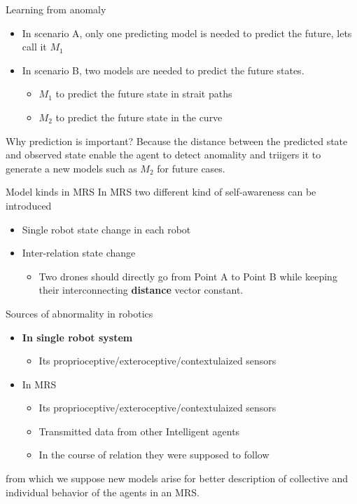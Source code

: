 \documentclass[unknownkeysallowed]{beamer}
\begin{document}
	\begin{frame}{Learning from anomaly}
		\begin{itemize}
			\item In scenario A, only one predicting model is needed to predict the future, lets call it $M_1$
			\item In scenario B, two models are needed to predict the future states.
			\begin{itemize}
				\item $M_1$ to predict the future state in strait paths
				\item $M_2$ to predict the future state in the curve
			\end{itemize}
		\end{itemize}
	\end{frame}

	\begin{frame}{Why prediction is important?}
		Because the distance between the predicted state and observed state enable the agent to detect anomality and triigers it to generate a new models such as $M_2$ for future cases.
	\end{frame}
	
	\begin{frame}{Model kinds in MRS}
		In MRS two different kind of self-awareness can be introduced
		\begin{itemize}
			\item Single robot state change in each robot
			\item Inter-relation state change
				\begin{itemize}
					\item Two drones should directly go from Point A to Point B while keeping their interconnecting \textbf{distance} vector constant.
				\end{itemize}
		\end{itemize}
	\end{frame}

	\begin{frame}{Sources of abnormality in robotics}
		\begin{itemize}
			\item \textbf{In single robot system}
				\begin{itemize}
					\item Its proprioceptive/exteroceptive/contextulaized sensors
				\end{itemize}
			\item In MRS
				\begin{itemize}
					\item Its proprioceptive/exteroceptive/contextulaized sensors
					\item Transmitted data from other Intelligent agents
					\item In the course of relation they were supposed to follow
				\end{itemize}
		\end{itemize}
		from which we suppose new models arise for better description of collective and individual behavior of the agents in an MRS. 
	\end{frame}
\end{document}
